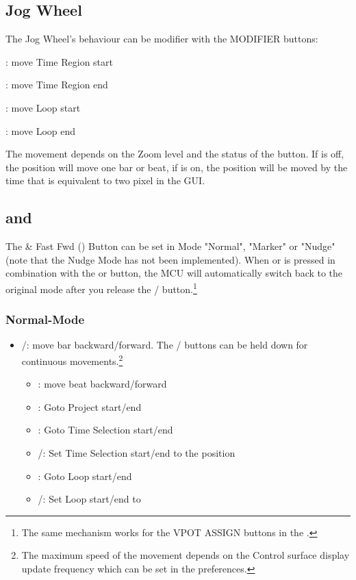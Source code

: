 \subsection{Jog Wheel}
The Jog Wheel's behaviour can be modifier with the MODIFIER buttons:
\begin{compactitem}
\item \shift: move Time Region start
\item \option: move Time Region end
\item \control: move Loop start
\item \alt: move Loop end
\end{compactitem}

The movement depends on the Zoom level and the status of the \scrub
button. If \scrub is off, the position will move one bar or beat, if
\scrub is on, the position will be moved by the time that is equivalent to two
pixel in the \reaper GUI.

\subsection{\rewind and \forward}

The \rewind \& Fast Fwd (\forward) Button can be set in Mode "Normal", "Marker" or
"Nudge" (note that the Nudge Mode has not been implemented). When \rewind or \forward is
pressed in combination with the \marker or \nudge button, the MCU will
automatically switch back to the original mode after you release the \marker/\nudge
button.\footnote{The same mechanism works for the VPOT ASSIGN buttons in the
\hyperref[csmodes]{\csms}.}

\subsubsection{Normal-Mode}
\begin{itemize}
\item \rewind/\forward: move  bar backward/forward. The \rewind/\forward
buttons can be held down for continuous movements.\footnote{The maximum speed of
the movement depends on the Control surface display update frequency which can be set
in the preferences.}
\bemod
\begin{itemize}
  \item \shift: move  beat backward/forward 
  \item \control: Goto Project start/end
  \item \option: Goto Time Selection start/end
  \item \shift/\option: Set Time Selection start/end to the \ec position 
  \item \alt: Goto Loop start/end
  \item \shift/\alt: Set Loop start/end to \ec 
\end{itemize}
\end{itemize}

